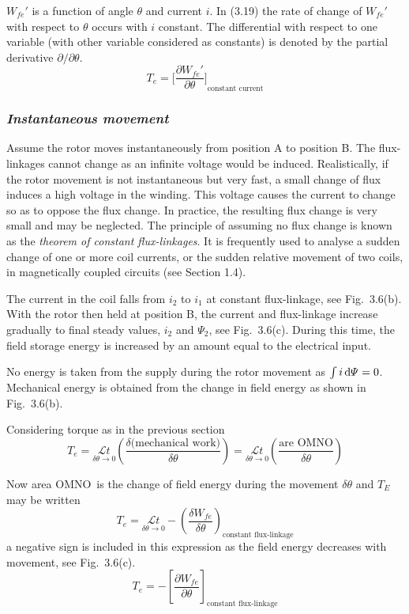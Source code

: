 \documentclass[a4paper,numbers=noenddot,12pt]{scrbook}
\begin{document}
$W_{fe}'$ is a function of angle $\theta$ and current $i$. In (3.19) the rate of change of $W_{fe}'$ with respect to $\theta$ occurs with $i$ constant. The differential with respect to one variable (with other variable considered as constants) is denoted by the partial derivative $\partial / \partial \theta$.
\begin{equation}
    T_e = {\Big[ \dfrac{\partial W_{fe}'}{\partial \theta}\Big]}_{\text{constant current}}
    \label{eq:Eq3.20}
\end{equation}

\subsubsection{\textit{Instantaneous movement}}
Assume the rotor moves instantaneously from position A to position B. The flux-linkages cannot change as an infinite voltage would be induced. Realistically, if the rotor movement is not instantaneous but very fast, a small change of flux induces a high voltage in the winding. This voltage causes the current to change so as to oppose the flux change. In practice, the resulting flux change is very small and may be neglected. The principle of
assuming no flux change is known as the \textit{theorem of constant flux-linkages}. It is frequently used to analyse a sudden change of one or more coil currents, or the sudden relative movement of two coils, in magnetically coupled circuits (see Section 1.4). 

The current in the coil falls from $i_2$ to $i_1$ at constant flux-linkage, see Fig.\ 3.6(b). With the rotor then held at position B, the current and flux-linkage increase gradually to final steady values, $i_2$ and $\varPsi_2$, see Fig.\ 3.6(c). During this time, the field storage energy is increased by an amount equal to the electrical input.

No energy is taken from the supply during the rotor movement as $\int i \dif \varPsi = 0$. Mechanical energy is obtained from the change in field energy as shown in Fig.\ 3.6(b).

Considering torque as in the previous section 
\begin{equation}
    T_e = \underset{\delta \theta \to 0}{\mathcal{L} t} \left(\dfrac{\delta \text{(mechanical work)}}{\delta \theta}\right) = \underset{\delta \theta \to 0}{\mathcal{L} t} \left(\dfrac{\text{are OMNO}}{\delta \theta}\right)
    \label{eq:Eq3.21}
\end{equation}

Now area OMNO\ is the change of field energy during the movement $\delta \theta$ and $T_E$ may be written 
\begin{equation}
    T_e = \underset{\delta \theta \to 0}{\mathcal{L} t} - {\left( \dfrac{\delta W_{fe}}{\delta \theta}\right)}_{\text{constant flux-linkage}}
    \label{eq:Ee3.22}
\end{equation}
a negative sign is included in this expression as the field energy decreases with movement, see Fig.\ 3.6(c). 
\begin{equation}
    T_e = - {\left[ \dfrac{\partial W_{fe}}{\partial \theta}\right]}_{\text{constant flux-linkage}}
    \label{eq_Eq3.23}
\end{equation}
\end{document}
